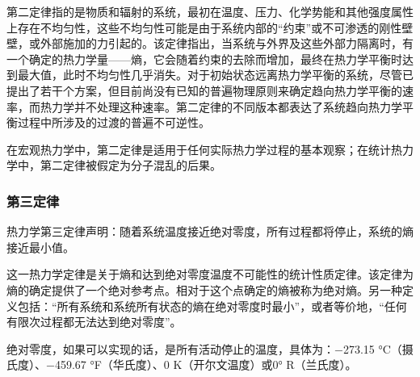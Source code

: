 第二定律指的是物质和辐射的系统，最初在温度、压力、化学势能和其他强度属性上存在不均匀性，这些不均匀性可能是由于系统内部的“约束”或不可渗透的刚性壁壁，或外部施加的力引起的。该定律指出，当系统与外界及这些外部力隔离时，有一个确定的热力学量——熵，它会随着约束的去除而增加，最终在热力学平衡时达到最大值，此时不均匀性几乎消失。对于初始状态远离热力学平衡的系统，尽管已提出了若干个方案，但目前尚没有已知的普遍物理原则来确定趋向热力学平衡的速率，而热力学并不处理这种速率。第二定律的不同版本都表达了系统趋向热力学平衡过程中所涉及的过渡的普遍不可逆性。

在宏观热力学中，第二定律是适用于任何实际热力学过程的基本观察；在统计热力学中，第二定律被假定为分子混乱的后果。
\subsubsection{第三定律}  
热力学第三定律声明：随着系统温度接近绝对零度，所有过程都将停止，系统的熵接近最小值。

这一热力学定律是关于熵和达到绝对零度温度不可能性的统计性质定律。该定律为熵的确定提供了一个绝对参考点。相对于这个点确定的熵被称为绝对熵。另一种定义包括：“所有系统和系统所有状态的熵在绝对零度时最小”，或者等价地，“任何有限次过程都无法达到绝对零度”。

绝对零度，如果可以实现的话，是所有活动停止的温度，具体为：−273.15 °C（摄氏度）、−459.67 °F（华氏度）、0 K（开尔文温度）或0° R（兰氏度）。